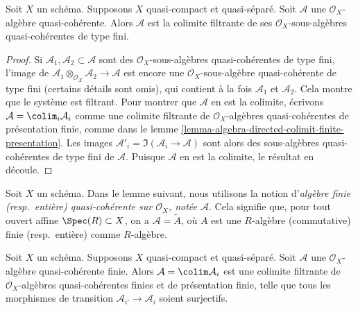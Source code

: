 \begin{lemma}
\label{lemma-algebra-directed-colimit-finite-type}
Soit $X$ un schéma. Supposons $X$ quasi-compact et quasi-séparé.
Soit $\mathcal{A}$ une $\mathcal{O}_X$-algèbre quasi-cohérente.
Alors $\mathcal{A}$ est la colimite filtrante de ses
$\mathcal{O}_X$-sous-algèbres quasi-cohérentes de type fini.
\end{lemma}

\begin{proof}
Si $\mathcal{A}_1, \mathcal{A}_2 \subset \mathcal{A}$ sont des
$\mathcal{O}_X$-sous-algèbres quasi-cohérentes de type fini, l'image de
$\mathcal{A}_1 \otimes_{\mathcal{O}_X} \mathcal{A}_2 \to \mathcal{A}$
est encore une $\mathcal{O}_X$-sous-algèbre quasi-cohérente de type fini
(certains détails sont omis), qui contient à la fois $\mathcal{A}_1$ et $\mathcal{A}_2$.
Cela montre que le système est filtrant.
Pour montrer que $\mathcal{A}$ en est la colimite, écrivons
$\mathcal{A} = \colim_i \mathcal{A}_i$ comme une colimite
filtrante de $\mathcal{O}_X$-algèbres quasi-cohérentes de présentation finie, comme dans le
lemme \ref{lemma-algebra-directed-colimit-finite-presentation}.
Les images $\mathcal{A}'_i = \Im(\mathcal{A}_i \to \mathcal{A})$ sont alors
des sous-algèbres quasi-cohérentes de type fini de $\mathcal{A}$. Puisque
$\mathcal{A}$ en est la colimite, le résultat en découle.
\end{proof}

\noindent
Soit $X$ un schéma. Dans le lemme suivant, nous utilisons la notion
d'{\it algèbre finie (resp.\ entière) quasi-cohérente
sur $\mathcal{O}_X$, notée $\mathcal{A}$}. Cela signifie que, pour tout
ouvert affine $\Spec(R) \subset X$, on a
$\mathcal{A} = \widetilde{A}$, où $A$ est une $R$-algèbre (commutative)
finie (resp.\ entière) comme $R$-algèbre.

\begin{lemma}
\label{lemma-finite-algebra-directed-colimit-finite-finitely-presented}
Soit $X$ un schéma. Supposons $X$ quasi-compact et quasi-séparé.
Soit $\mathcal{A}$ une $\mathcal{O}_X$-algèbre quasi-cohérente finie.
Alors $\mathcal{A} = \colim \mathcal{A}_i$ est une colimite filtrante de
$\mathcal{O}_X$-algèbres quasi-cohérentes finies et de présentation finie,
telle que tous les morphismes de transition $\mathcal{A}_{i'} \to \mathcal{A}_i$
soient surjectifs.
\end{lemma}

